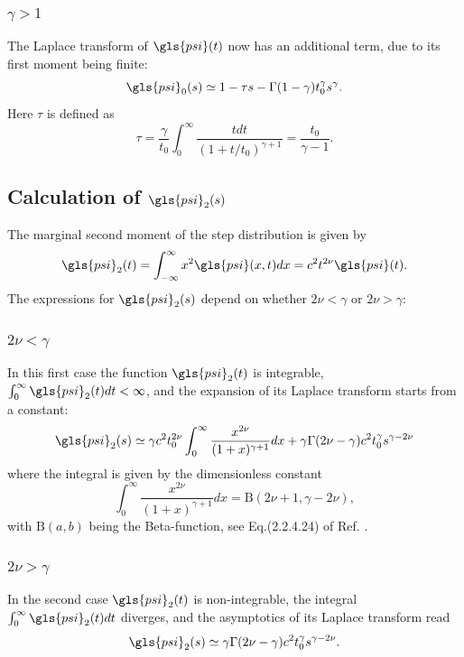 \subsubsection*{$ \gamma>1$}
The Laplace transform of $\gls{psi}(t)$ now has an additional term, due to its first moment being finite:
\begin{equation}
\gls{psi}_{0}(s) \simeq 1 - \tau s - \Gamma(1-\gamma ) t_0^\gamma s^\gamma.
\label{eqn:psi0GammaBig}
\end{equation}  
Here $\tau$ is defined as 
\begin{equation}
 \tau = \frac{\gamma}{t_0} \int_0^\infty \frac{t dt}{(1+t/t_0)^{\gamma +1}} = 
 \frac{t_0}{\gamma-1} . \label{eq:tau}
\end{equation}

\subsection*{Calculation of $\gls{psi}_2(s)$}
The marginal second moment of the step distribution is given by  
\begin{align}
 \gls{psi}_2(t) = \int_{-\infty}^\infty x^2 \gls{psi}(x,t) dx = c^2 t^{2 \nu} \gls{psi}(t).
\end{align}
The expressions for $\gls{psi}_2(s)$ depend on whether $2 \nu < \gamma $ or $2 \nu > \gamma$:

\subsubsection{$2\nu<\gamma$} 
In this first case the function $\gls{psi}_2(t)$ is integrable, $\int_0^\infty \gls{psi}_2(t) dt < \infty$, and the expansion 
of its Laplace transform starts from a constant:
\begin{equation}
 \gls{psi}_2(s) \simeq \gamma c^2 t_0^{2\nu}  \int_0^\infty \frac{x^{2\nu}}{(1+x)^{\gamma+1}} dx  + \gamma \Gamma(2\nu-\gamma) c^2t_0^\gamma s^{\gamma-2\nu} \label{eqn:psi2NuSmall}
\end{equation}
where the integral is given by the dimensionless constant 
\begin{equation}
 \int_0^\infty \frac{x^{2\nu}}{(1+x)^{\gamma+1}} dx = \mathrm{B}(2\nu+1,\gamma-2\nu), \label{eqn:I1}
\end{equation}
with $\mathrm{B}(a,b)$ being the Beta-function, see Eq.(2.2.4.24) of Ref. \cite{BryPr}.  

\subsubsection{$2\nu>\gamma$} 
In the second case $\gls{psi}_2(t)$ is non-integrable, the integral $\int_0^\infty \gls{psi}_2(t) dt$ diverges, and the asymptotics of its Laplace transform read
\begin{align}
 \gls{psi}_2(s) \simeq \gamma \Gamma(2\nu-\gamma) c^2  t_0^\gamma s^{\gamma-2\nu}. \label{eqn:psi2NuBig}
\end{align}

